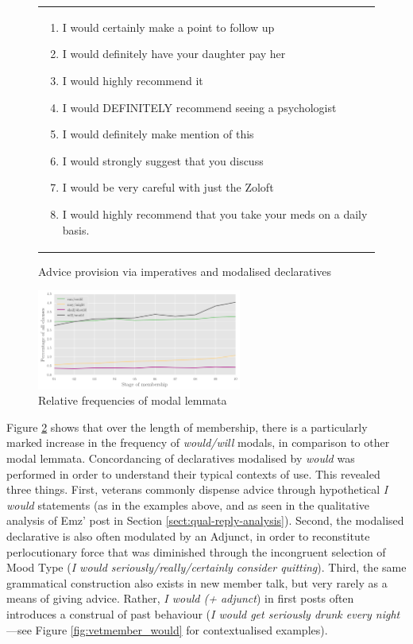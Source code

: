 \begin{figure}
\begin{tabular}[t]{@{}>{\raggedright\arraybackslash}p{}@{}}
    \begin{enumerate}  [before=\itshape,font=\normalfont] \singlespacing \setlength\itemsep{0em} \footnotesize
    \item I would certainly make a point to follow up
    \item I would definitely have your daughter pay her
    \item I would highly recommend it
    \item I would DEFINITELY recommend seeing a psychologist
    \item I would definitely make mention of this
    \item I would strongly suggest that you discuss
    \item I would be very careful with just the Zoloft
    \item I would highly recommend that you take your meds on a daily basis.
    \end{enumerate}
    \end{tabular}
    \caption{Advice provision via imperatives and modalised declaratives}
    \label{fig:imp_and_mod}
    \end{figure}
    \begin{figure}[htb]
    \centering
    \includegraphics[width=0.6\textwidth]{../images/modalnew.png}
    \caption{Relative frequencies of modal lemmata}
    \label{fig:modals}
    \end{figure}
%
Figure \ref{fig:modals} shows that over the length of membership, there is a particularly marked increase in the frequency of \emph{would\slash will} modals, in comparison to other modal lemmata. Concordancing of declaratives modalised by \emph{would} was performed in order to understand their typical contexts of use. This revealed three things. First, veterans commonly dispense advice through hypothetical \emph{I would} statements (as in the examples above, and as seen in the qualitative analysis of Emz' post in Section \ref{sect:qual-reply-analysis}). Second, the modalised declarative is also often modulated by an Adjunct, in order to reconstitute perlocutionary force that was diminished through the incongruent selection of Mood Type (\emph{I would seriously\slash really\slash certainly consider quitting}). Third, the same grammatical construction also exists in new \gls{member} talk, but very rarely as a means of giving advice. Rather, \emph{I would (+ adjunct}) in first \glspl{post} often introduces a construal of past behaviour (\emph{I would get seriously drunk every night}---see Figure \ref{fig:vetmember_would} for contextualised examples).

